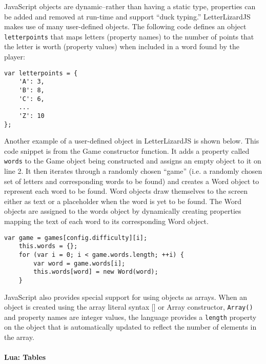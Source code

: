 JavaScript objects are dynamic--rather than having a static type, properties can be added
and removed at run-time and support ``duck typing.'' LetterLizardJS makes use of many
user-defined objects. The following code defines an object \texttt{letterpoints} that
maps letters (property names) to the number of points that the letter is worth
(property values) when included in a word found by the player:

\begin{lstlisting}[caption=A user-defined object in JavaScript]
var letterpoints = {
	'A': 3,
	'B': 8,
	'C': 6,
	...
	'Z': 10
};
\end{lstlisting}

Another example of a user-defined object in LetterLizardJS is shown below. This code
snippet is from the Game constructor function. It adds a property called 
\texttt{words} to the Game object being constructed and assigns an empty object
to it on line 2. It then iterates through a randomly chosen ``game'' (i.e. a
randomly chosen set of letters and corresponding words to be found) and creates
a Word object to represent each word to be found. Word objects draw themselves to the
screen either as text or a placeholder when the word is yet to be found. The Word
objects are assigned to the words object by dynamically creating properties mapping
the text of each word to its corresponding Word object.

\begin{lstlisting}[caption=A user-defined object demonstrating dynamic properties]
	var game = games[config.difficulty][i];
	this.words = {};
	for (var i = 0; i < game.words.length; ++i) {
		var word = game.words[i];
		this.words[word] = new Word(word);
	}
\end{lstlisting}

JavaScript also provides special support for using objects as arrays. When an object 
is created using the array literal syntax [] or Array constructor, \texttt{Array()}
and property names are integer values, the language provides a \texttt{length} property
on the object that is automatically updated to reflect the number of elements in the array.

\paragraph{Lua: Tables}

